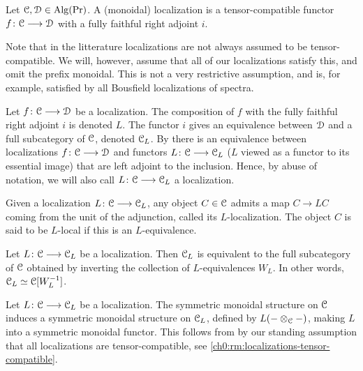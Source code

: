 \begin{definition}
    \label{ch0:def:localization}
    Let $\EuScript{C}, \EuScript{D}\in \operatorname{Alg}(\Pr)$. A (monoidal) { localization} is a tensor-compatible functor $f\colon \EuScript{C}\longrightarrow \EuScript{D}$ with a fully faithful right adjoint $i$. 
\end{definition}

\begin{remark}
    \label{ch0:rm:localizations-tensor-compatible}
    Note that in the litterature localizations are not always assumed to be tensor-compatible. We will, however, assume that all of our localizations satisfy this, and omit the prefix monoidal. This is not a very restrictive assumption, and is, for example, satisfied by all Bousfield localizations of spectra. 
\end{remark}

\begin{remark}
    Let $f\colon \EuScript{C}\longrightarrow \EuScript{D}$ be a localization. The composition of $f$ with the fully faithful right adjoint $i$ is denoted $L$. The functor $i$ gives an equivalence between $\EuScript{D}$ and a full subcategory of $\EuScript{C}$, denoted $\EuScript{C}_L$. By \cite[5.2.7.4]{lurie_09} there is an equivalence between localizations $f\colon \EuScript{C}\longrightarrow \EuScript{D}$ and functors $L\colon \EuScript{C}\longrightarrow \EuScript{C}_L$ ($L$ viewed as a functor to its essential image) that are left adjoint to the inclusion. Hence, by abuse of notation, we will also call $L\colon \EuScript{C}\longrightarrow \EuScript{C}_L$ a localization. 
\end{remark}

\begin{definition}
    Given a localization $L\colon \EuScript{C}\longrightarrow \EuScript{C}_L$, any object $C\in \EuScript{C}$ admits a map $C\longrightarrow LC$ coming from the unit of the adjunction, called its { $L$-localization}. The object $C$ is said to be { $L$-local} if this is an $L$-equivalence. 
\end{definition}

\begin{proposition}
    Let $L\colon \EuScript{C}\longrightarrow \EuScript{C}_L$ be a localization. Then $\EuScript{C}_L$ is equivalent to the full subcategory of $\EuScript{C}$ obtained by inverting the collection of $L$-equivalences $W_L$. In other words, $\EuScript{C}_L\simeq \EuScript{C}[W_L^{-1}]$.
\end{proposition}

\begin{remark}
    \label{ch0:rm:monoidal-localization}
    Let $L\colon \EuScript{C}\longrightarrow \EuScript{C}_L$ be a localization. The symmetric monoidal structure on $\EuScript{C}$ induces a symmetric monoidal structure on $\EuScript{C}_L$, defined by $L(-\otimes_{\EuScript{C}} -)$, making $L$ into a symmetric monoidal functor. This follows from \cite[2.2.1.9]{Lurie_HA} by our standing assumption that all localizations are tensor-compatible, see \cref{ch0:rm:localizations-tensor-compatible}. 
\end{remark}

